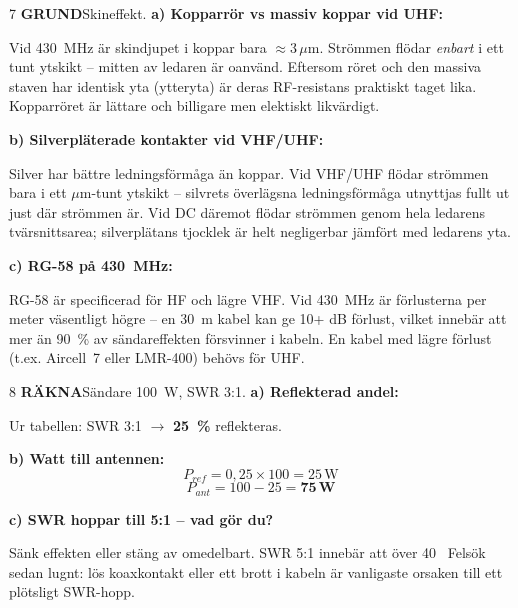\documentclass[a4paper,11pt,twoside]{book}
\newcommand{\qgrund}{\colorbox{greenpale}{\textcolor{greendark}{\headingfont\bfseries\tiny GRUND}}}
\newcommand{\qrakna}{\colorbox{bluepale}{\textcolor{bluedark}{\headingfont\bfseries\tiny RÄKNA}}}
\begin{document}
\begin{facitblock}{7}
\qgrund\quad Skineffekt.
\tcblower
\textbf{a) Kopparrör vs massiv koppar vid UHF:}

Vid 430~MHz är skindjupet i koppar bara $\approx 3\,\mu\text{m}$. 
Strömmen flödar \emph{enbart} i ett tunt ytskikt -- 
mitten av ledaren är oanvänd. Eftersom röret och 
den massiva staven har identisk yta (ytteryta) är 
deras RF-resistans praktiskt taget lika. Kopparröret 
är lättare och billigare men elektiskt likvärdigt.

\textbf{b) Silverpläterade kontakter vid VHF/UHF:}

Silver har bättre ledningsförmåga än koppar. 
Vid VHF/UHF flödar strömmen bara i ett $\mu$m-tunt 
ytskikt -- silvrets överlägsna ledningsförmåga 
utnyttjas fullt ut just där strömmen är. Vid DC 
däremot flödar strömmen genom hela ledarens 
tvärsnittsarea; silverplätans tjocklek är helt 
negligerbar jämfört med ledarens yta.

\textbf{c) RG-58 på 430~MHz:}

RG-58 är specificerad för HF och lägre VHF. Vid 
430~MHz är förlusterna per meter väsentligt högre 
-- en 30~m kabel kan ge 10+ dB förlust, vilket 
innebär att mer än 90~\% av sändareffekten försvinner 
i kabeln. En kabel med lägre förlust (t.ex. 
Aircell~7 eller LMR-400) behövs för UHF.
\end{facitblock}


\begin{facitblock}{8}
\qrakna\quad Sändare 100~W, SWR 3:1.
\tcblower
\textbf{a) Reflekterad andel:}

Ur tabellen: SWR 3:1 $\rightarrow$ \textbf{25~\%} reflekteras.

\textbf{b) Watt till antennen:}
\[ P_{ref} = 0{,}25 \times 100 = 25\,\text{W} \]
\[ P_{ant} = 100 - 25 = \mathbf{75\,\text{W}} \]

\textbf{c) SWR hoppar till 5:1 -- vad gör du?}

Sänk effekten eller stäng av omedelbart. SWR 5:1 innebär att över 40~%
Felsök sedan lugnt: lös koaxkontakt eller ett brott i kabeln är vanligaste orsaken till ett plötsligt SWR-hopp.
\end{facitblock}
\end{document}
